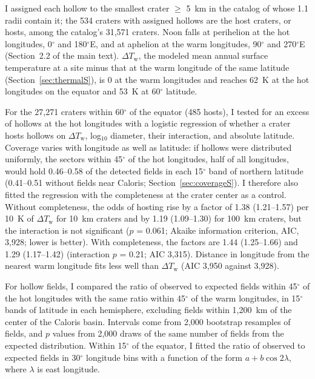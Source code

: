 \documentclass{planetary}
\begin{document}
I assigned each hollow to the smallest crater $\geq$ 5~km in the catalog of \textcite{herrick2018} whose 1.1 radii contain it; the 534 craters with assigned hollows are the host craters, or hosts, among the catalog's 31,571 craters. Noon falls at perihelion at the hot longitudes, 0$^\circ$ and 180$^\circ$E, and at aphelion at the warm longitudes, 90$^\circ$ and 270$^\circ$E (Section~2.2 of the main text). $\Delta T_\mathrm{w}$, the modeled mean annual surface temperature at a site minus that at the warm longitude of the same latitude (Section~\ref{sec:thermalS}), is 0 at the warm longitudes and reaches 62~K at the hot longitudes on the equator and 53~K at 60$^\circ$ latitude.

For the 27,271 craters within 60$^\circ$ of the equator (485 hosts), I tested for an excess of hollows at the hot longitudes with a logistic regression of whether a crater hosts hollows on $\Delta T_\mathrm{w}$, log$_{10}$ diameter, their interaction, and absolute latitude. Coverage varies with longitude as well as latitude: if hollows were distributed uniformly, the sectors within 45$^\circ$ of the hot longitudes, half of all longitudes, would hold 0.46--0.58 of the detected fields in each 15$^\circ$ band of northern latitude (0.41--0.51 without fields near Caloris; Section~\ref{sec:coverageS}). I therefore also fitted the regression with the completeness at the crater center as a control. Without completeness, the odds of hosting rise by a factor of 1.38 (1.21--1.57) per 10~K of $\Delta T_\mathrm{w}$ for 10~km craters and by 1.19 (1.09--1.30) for 100~km craters, but the interaction is not significant ($p$ = 0.061; Akaike information criterion, AIC, 3,928; lower is better). With completeness, the factors are 1.44 (1.25--1.66) and 1.29 (1.17--1.42) (interaction $p$ = 0.21; AIC 3,315). Distance in longitude from the nearest warm longitude fits less well than $\Delta T_\mathrm{w}$ (AIC 3,950 against 3,928).

For hollow fields, I compared the ratio of observed to expected fields within 45$^\circ$ of the hot longitudes with the same ratio within 45$^\circ$ of the warm longitudes, in 15$^\circ$ bands of latitude in each hemisphere, excluding fields within 1,200~km of the center of the Caloris basin. Intervals come from 2,000 bootstrap resamples of fields, and $p$ values from 2,000 draws of the same number of fields from the expected distribution. Within 15$^\circ$ of the equator, I fitted the ratio of observed to expected fields in 30$^\circ$ longitude bins with a function of the form $a + b \cos 2\lambda$, where $\lambda$ is east longitude.
\end{document}
